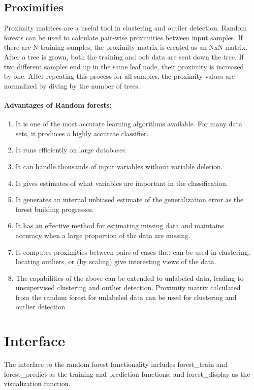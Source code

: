 \subsection{Proximities}
Proximity matrices are a useful tool in clustering and outlier detection.
Random forests can be used to calculate pair-wise proximities between input samples.
If there are N training samples, the proximity matrix is created as an NxN matrix. After a
tree is grown, both the training and oob data are sent down the tree. If two different samples
end up in the same leaf node, their proximity is increased by one. After repeating this process
for all samples, the proximity values are normalized by diving by the number of trees.

\paragraph{Advantages of Random forests:}

\begin{enumerate}
    \item It is one of the most accurate learning algorithms available. For many data sets, it
    produces a highly accurate classifier.
    \item It runs efficiently on large databases.
    \item It can handle thousands of input variables without variable deletion.
    \item It gives estimates of what variables are important in the classification.
    \item It generates an internal unbiased estimate of the generalization error as the forest
    building progresses.
    \item It has an effective method for estimating missing data and maintains accuracy
    when a large proportion of the data are missing.
    \item It computes proximities between pairs of cases that can be used in clustering, locating
    outliers, or (by scaling) give interesting views of the data.
    \item The capabilities of the above can be extended to unlabeled data, leading to
    unsupervised clustering and outlier detection. Proximity matrix calculated from the random forest 
    for unlabeled data can be used for clustering and outlier detection.
\end{enumerate}

\section{Interface} %
\label{sec:interface}
The interface to the random forest functionality includes forest\_train and forest\_predict as
the training and prediction functions, and forest\_display as the visualization function.

